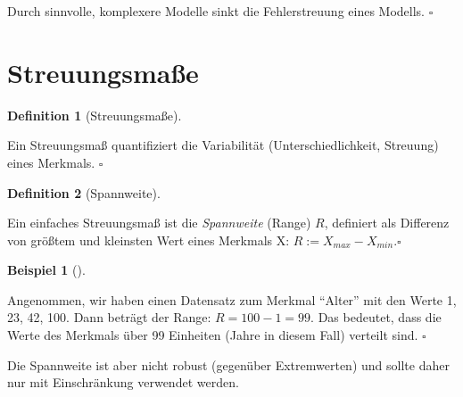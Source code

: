 \documentclass[
  letterpaper,
  oneside,
  open=any]{scrbook}
\theoremstyle{definition}
\theoremstyle{definition}
\newtheorem{example}{Beispiel}[chapter]
\theoremstyle{definition}
\newtheorem{definition}{Definition}[chapter]
\theoremstyle{remark}
\begin{document}
\begin{tcolorbox}[enhanced jigsaw, bottomrule=.15mm, left=2mm, colbacktitle=quarto-callout-important-color!10!white, bottomtitle=1mm, colframe=quarto-callout-important-color-frame, coltitle=black, rightrule=.15mm, breakable, toptitle=1mm, titlerule=0mm, title=\textcolor{quarto-callout-important-color}{\faExclamation}\hspace{0.5em}{Wichtig}, opacitybacktitle=0.6, arc=.35mm, colback=white, leftrule=.75mm, opacityback=0, toprule=.15mm]

Durch sinnvolle, komplexere Modelle sinkt die Fehlerstreuung eines
Modells. \(\square\)

\end{tcolorbox}

\section{Streuungsmaße}\label{sec-streuung}

\begin{definition}[Streuungsmaße]\protect\hypertarget{def-streuungsmaße}{}\label{def-streuungsmaße}

Ein Streuungsmaß quantifiziert die Variabilität (Unterschiedlichkeit,
Streuung) eines Merkmals. \(\square\)

\end{definition}

\begin{definition}[Spannweite]\protect\hypertarget{def-range}{}\label{def-range}

Ein einfaches Streuungsmaß ist die \emph{Spannweite} (Range) \(R\),
definiert als Differenz von größtem und kleinsten Wert eines Merkmals X:
\(R := X_{max} - X_{min}. \square\)

\end{definition}

\begin{example}[]\protect\hypertarget{exm-range}{}\label{exm-range}

Angenommen, wir haben einen Datensatz zum Merkmal \enquote{Alter} mit
den Werte 1, 23, 42, 100. Dann beträgt der Range: \(R = 100 - 1 = 99\).
Das bedeutet, dass die Werte des Merkmals über 99 Einheiten (Jahre in
diesem Fall) verteilt sind. \(\square\)

\end{example}

Die Spannweite ist aber nicht robust (gegenüber Extremwerten) und sollte
daher nur mit Einschränkung verwendet werden.
\end{document}

